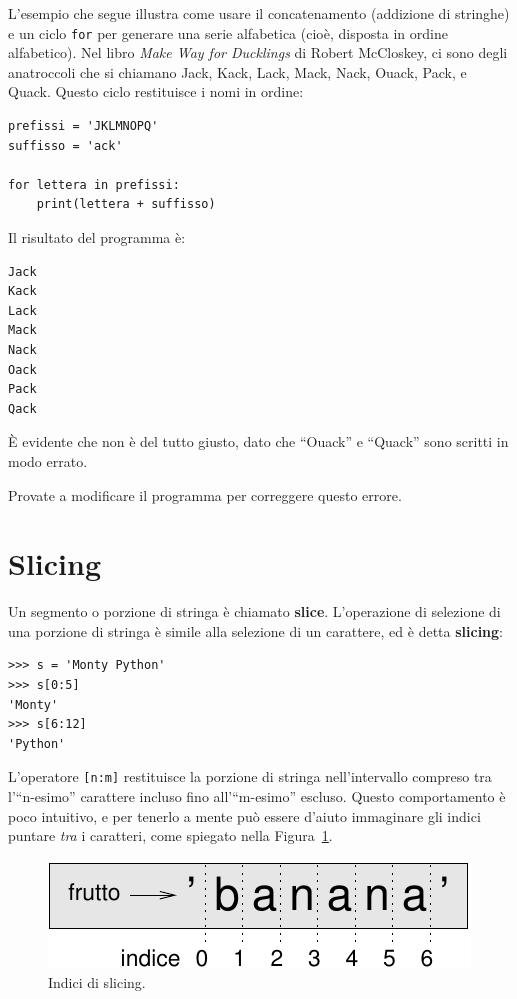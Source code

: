 \documentclass[10pt]{book}
\begin{document}
L'esempio che segue illustra come usare il concatenamento (addizione di stringhe) e un ciclo {\tt for} per generare una serie alfabetica (cioè, disposta in ordine alfabetico). Nel libro {\em Make Way for Ducklings} di Robert McCloskey, ci sono degli anatroccoli che si chiamano Jack, Kack, Lack, Mack, Nack, Ouack, Pack, e Quack.  Questo ciclo restituisce i nomi in ordine:

\begin{verbatim}
prefissi = 'JKLMNOPQ'
suffisso = 'ack'

for lettera in prefissi:
    print(lettera + suffisso)
\end{verbatim}
%
Il risultato del programma è:

\begin{verbatim}
Jack
Kack
Lack
Mack
Nack
Oack
Pack
Qack
\end{verbatim}
%
È evidente che non è del tutto giusto, dato che ``Ouack'' e ``Quack'' sono scritti in modo errato.

Provate a modificare il programma per correggere questo errore.


\section{Slicing}
\label{slice}

Un segmento o porzione di stringa è chiamato {\bf slice}. L'operazione di selezione di una porzione di stringa è simile alla selezione di un carattere, ed è detta {\bf slicing}:

\begin{verbatim}
>>> s = 'Monty Python'
>>> s[0:5]
'Monty'
>>> s[6:12]
'Python'
\end{verbatim}
%
L'operatore {\tt [n:m]} restituisce la porzione di stringa nell'intervallo compreso tra l'``n-esimo'' carattere incluso fino all'``m-esimo'' escluso. Questo comportamento è poco intuitivo, e per tenerlo a mente può essere d'aiuto immaginare gli indici puntare {\em tra} i caratteri, come spiegato nella Figura~\ref{fig.banana}.

\begin{figure}
\centerline
{\includegraphics[scale=0.8]{figs/banana.pdf}}
\caption{Indici di slicing.}
\label{fig.banana}
\end{figure}
\end{document}
